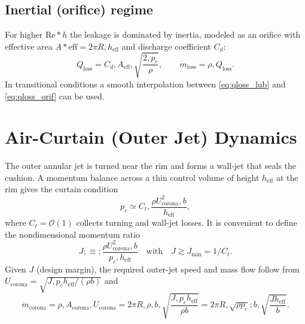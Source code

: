 \documentclass[11pt,a4paper]{article}
\begin{document}
\subsection*{Inertial (orifice) regime}
For higher $\mathrm{Re}*h$ the leakage is dominated by inertia, modeled as an orifice with effective area $A*{\mathrm{eff}}=2\pi R,h_{\mathrm{eff}}$ and discharge coefficient $C_d$:
\begin{equation}
Q_{\mathrm{loss}} = C_d,A_{\mathrm{eff}},\sqrt{\frac{2,p_c}{\rho}},
\qquad \dot m_{\mathrm{loss}}=\rho,Q_{\mathrm{loss}}.
\label{eq:qloss_orif}
\end{equation}
In transitional conditions a smooth interpolation between \eqref{eq:qloss_lub} and \eqref{eq:qloss_orif} can be used.

\section{Air-Curtain (Outer Jet) Dynamics}
The outer annular jet is turned near the rim and forms a wall-jet that seals the cushion. A momentum balance across a thin control volume of height $h_{\mathrm{eff}}$ at the rim gives the curtain condition
\begin{equation}
p_c \simeq C_t,\frac{\rho U_{\mathrm{corona}}^{2} , b}{h_{\mathrm{eff}}},
\label{eq:curtain_force}
\end{equation}
where $C_t=\mathcal{O}(1)$ collects turning and wall-jet losses. It is convenient to define the nondimensional momentum ratio
\begin{equation}
J;\equiv; \frac{\rho U_{\mathrm{corona}}^{2},b}{p_c,h_{\mathrm{eff}}} \quad \text{with} \quad J\gtrsim J_{\min}=1/C_t.
\label{eq:J}
\end{equation}
Given $J$ (design margin), the required outer-jet speed and mass flow follow from $U_{\mathrm{corona}}=\sqrt{J,p_c h_{\mathrm{eff}}/(\rho b)}$ and
\begin{equation}
\dot m_{\mathrm{corona}} = \rho,A_{\mathrm{corona}},U_{\mathrm{corona}} = 2\pi R,\rho,b,\sqrt{\frac{J,p_c h_{\mathrm{eff}}}{\rho b}} = 2\pi R,\sqrt{\rho p_c}; b,\sqrt{\frac{J h_{\mathrm{eff}}}{b}}.
\label{eq:mcorona}
\end{equation}
\end{document}
